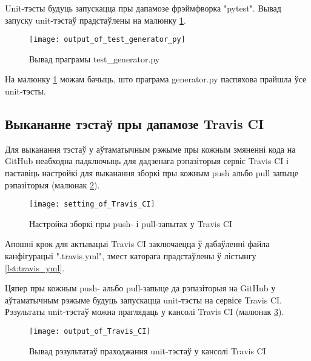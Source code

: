

Unit-тэсты будуць запускацца пры дапамозе фрэймфворка "pytest".
Вывад запуску unit-тэстаў прадстаўлены на малюнку
\ref{figure:output of test_generator.py}.

\clearpage

\begin{figure}[h!]
    \centering
    \texttt{[image: output\_of\_test\_generator\_py]}
    \caption{Вывад праграмы test\_generator.py}
    \label{figure:output of test_generator.py} 
\end{figure}

На малюнку \ref{figure:output of test_generator.py} можам бачыць,
што праграма generator.py паспяхова прайшла ўсе unit-тэсты.

\subsection{Выкананне тэстаў пры дапамозе Travis CI}

Для выканання тэстаў у аўтаматычным рэжыме пры кожным змяненні
кода на GitHub неабходна падключыць для дадзенага рэпазіторыя
сервіс Travis CI і паставіць настройкі для выканання зборкі пры
кожным push альбо pull запыце рэпазіторыя
(малюнак \ref{figure:setting of Travis CI}).

\begin{figure}[h!]
    \centering
    \texttt{[image: setting\_of\_Travis\_CI]}
    \caption{Настройка зборкі пры push- і pull-запытах у Travis CI}
    \label{figure:setting of Travis CI} 
\end{figure}

Апошні крок для актывацыі Travis CI заключаецца ў дабаўленні файла
канфігурацыі ".travis.yml", змест каторага прадстаўлены ў лістынгу
\ref{lst:travis_yml}.



Цяпер пры кожным push- альбо pull-запыце да рэпазіторыя на GitHub
у аўтаматычным рэжыме будуць запускацца unit-тэсты на сервісе Travis CI.
Рэзультаты unit-тэстаў можна праглядаць у кансолі Travis CI
(малюнак \ref{figure:output of Travis CI}).

\clearpage

\begin{figure}[h!]
    \centering
    \texttt{[image: output\_of\_Travis\_CI]}
    \caption{Вывад рэзультатаў праходжання unit-тэстаў
             у кансолі Travis CI}
    \label{figure:output of Travis CI} 
\end{figure}

